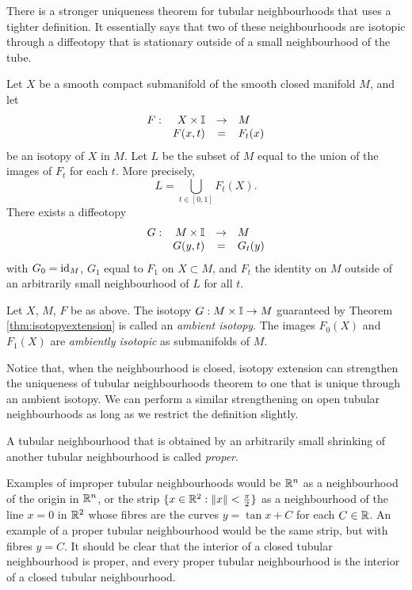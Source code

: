 There is a stronger uniqueness theorem for tubular neighbourhoods that uses a tighter definition.
It essentially says that two of these neighbourhoods are isotopic through a diffeotopy that is stationary outside of a small neighbourhood of the tube.

\begin{theorem}
	\label{thm:isotopyextension}
	Let $X$ be a smooth compact submanifold of the smooth closed manifold $M$, and let
	\[
		\begin{array}{crcl}
			F: & X\times\mathbb{I} & \to & M \\
			   & F(x,t) & = & F_t(x)
		\end{array}
	\]
	be an isotopy of $X$ in $M$.
	Let $L$ be the subset of $M$ equal to the union of the images of $F_t$ for each $t$.
	More precisely,
	\[
		L = \bigcup_{t\in[0,1]} F_t(X).
	\]
	There exists a diffeotopy 
	\[
		\begin{array}{crcl}
			G: & M\times\mathbb{I} & \to & M \\
			   & G(y,t) & = & G_t(y)				
		\end{array}
	\]
	with $G_0=\textrm{id}_{M}$, $G_1$ equal to $F_1$ on $X\subset M$, and $F_t$ the identity on $M$ outside of an arbitrarily small neighbourhood of $L$ for all $t$.
\end{theorem}

\begin{defn}
	\label{def:ambientisotopy}
	Let $X$, $M$, $F$ be as above.
	The isotopy $G:M\times\mathbb{I}\to M$ guaranteed by Theorem \ref{thm:isotopyextension} is called an \emph{ambient isotopy}.
	The images $F_0(X)$ and $F_1(X)$ are \emph{ambiently isotopic} as submanifolds of $M$.
\end{defn}

Notice that, when the neighbourhood is closed, isotopy extension can strengthen the uniqueness of tubular neighbourhoods theorem to one that is unique through an ambient isotopy.
We can perform a similar strengthening on open tubular neighbourhoods as long as we restrict the definition slightly.

\begin{defn}
	A tubular neighbourhood that is obtained by an arbitrarily small shrinking of another tubular neighbourhood is called \emph{proper}.
\end{defn}

Examples of improper tubular neighbourhoods would be $\mathbb{R}^n$ as a neighbourhood of the origin in $\mathbb{R}^n$, or the strip $\{ x\in \mathbb{R}^2 : \left\lVert x \right\rVert< \frac{\pi}{2}\}$ as a neighbourhood of the line $x=0$ in $\mathbb{R}^2$ whose fibres are the curves $y=\tan x + C$ for each $C\in\mathbb{R}$.
An example of a proper tubular neighbourhood would be the same strip, but with fibres $y=C$.
It should be clear that the interior of a closed tubular neighbourhood is proper, and every proper tubular neighbourhood is the interior of a closed tubular neighbourhood.

